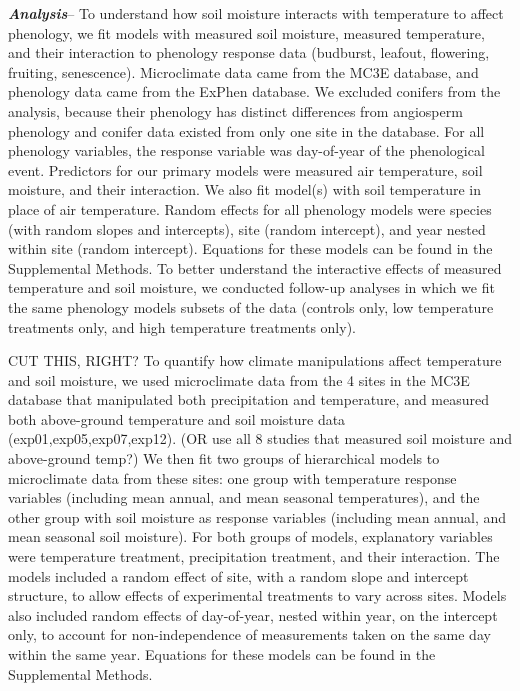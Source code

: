 \documentclass{article}
\begin{document}
\textbf {\emph{Analysis}}--
To understand how soil moisture interacts with temperature to affect phenology, we fit models with measured soil moisture, measured temperature, and their interaction to phenology response data (budburst, leafout, flowering, fruiting, senescence). Microclimate data came from the MC3E database, and phenology data came from the ExPhen database. We excluded conifers from the analysis, because their phenology has distinct differences from angiosperm phenology \cite{polgar2014} and conifer data existed from only one site in the database. For all phenology variables, the response variable was day-of-year of the phenological event. Predictors for our primary models were measured air temperature, soil moisture, and their interaction. We also fit model(s) with soil temperature in place of air temperature. Random effects for all phenology models were species (with random slopes and intercepts), site (random intercept), and year nested within site (random intercept). Equations for these models can be found in the Supplemental Methods. 
To better understand the interactive effects of measured temperature and soil moisture, we conducted follow-up analyses in which we fit the same phenology models subsets of the data (controls only, low temperature treatments only, and high temperature treatments only).

\par CUT THIS, RIGHT? To quantify how climate manipulations affect temperature and soil moisture, we used microclimate data from the 4 sites in the MC3E database that manipulated both precipitation and temperature, and measured both above-ground temperature and soil moisture data (exp01,exp05,exp07,exp12). (OR use all 8 studies that measured soil moisture and above-ground temp?) We then fit two groups of hierarchical models to microclimate data from these sites: one group with temperature response variables (including mean annual, and mean seasonal temperatures), and the other group with soil moisture as response variables (including mean annual, and mean seasonal soil moisture). For both groups of models, explanatory variables were temperature treatment, precipitation treatment, and their interaction. The models included a random effect of site, with a random slope and intercept structure, to allow effects of experimental treatments to vary across sites. Models also included random effects of day-of-year, nested within year, on the intercept only, to account for non-independence of measurements taken on the same day within the same year. Equations for these models can be found in the Supplemental Methods. 
\end{document}
